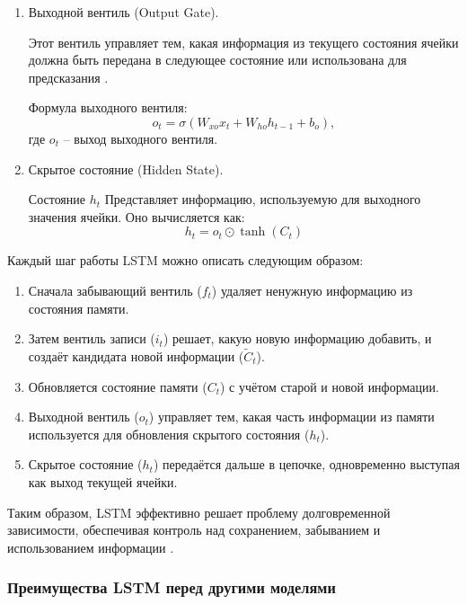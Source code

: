 \documentclass[spec, och, diploma]{SCWorks}
\begin{document}
\begin{enumerate}
    \item Выходной вентиль (Output Gate). 
    
    Этот вентиль управляет тем, какая информация из текущего состояния ячейки должна быть передана в следующее 
    состояние или использована для предсказания \cite{lstm1}.  
    
    Формула выходного вентиля:  
    \begin{equation}
        o_t = \sigma(W_{xo}x_t + W_{ho}h_{t-1} + b_o),
    \end{equation}
     где $o_t$ -- выход выходного вентиля.  
    
    \item Скрытое состояние (Hidden State).  
   
    Состояние $h_t$ Представляет информацию, используемую для выходного значения ячейки. Оно вычисляется как:  
    \begin{equation}
        h_t = o_t \odot \tanh(C_t)
    \end{equation}
  
  \end{enumerate}


  Каждый шаг работы LSTM можно описать следующим образом:  

  \begin{enumerate}
    \item Сначала забывающий вентиль (\(f_t\)) удаляет ненужную информацию из состояния памяти.  
    \item Затем вентиль записи (\(i_t\)) решает, какую новую информацию добавить, и создаёт кандидата новой информации (\(\tilde{C}_t\)).  
    \item Обновляется состояние памяти (\(C_t\)) с учётом старой и новой информации.  
    \item Выходной вентиль (\(o_t\)) управляет тем, какая часть информации из памяти используется для обновления скрытого состояния (\(h_t\)).  
    \item Скрытое состояние (\(h_t\)) передаётся дальше в цепочке, одновременно выступая как выход текущей ячейки.  
  \end{enumerate}

  Таким образом, LSTM эффективно решает проблему долговременной зависимости, обеспечивая контроль над сохранением, забыванием и использованием информации \cite{grad}.

\subsubsection{Преимущества LSTM перед другими моделями}
\end{document}
